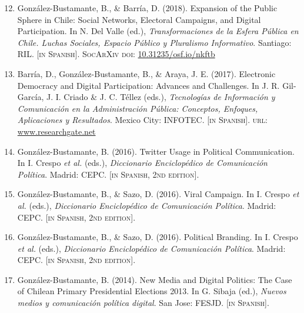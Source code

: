 \documentclass[letterpaper,margin]{res}
\newenvironment{benumerate}[1]{
    \let\oldItem\item
    \def\item{\addtocounter{enumi}{-2}\oldItem}
    \begin{enumerate}
    \setcounter{enumi}{#1}
    \addtocounter{enumi}{1}
}{
    \end{enumerate}
}
\begin{document}
\begin{resume}
\begin{benumerate}{11}
\item{\small Gonz\'alez-Bustamante, B., \& Barr\'ia, D. (2018). Expansion of the Public Sphere in Chile: Social Networks, Electoral Campaigns, and Digital Participation. In N. Del Valle (ed.), {\itshape Transformaciones de la Esfera P\'ublica en Chile. Luchas Sociales, Espacio P\'ublico y Pluralismo Informativo}. Santiago: RIL. {\footnotesize \scshape [in Spanish]}. {\scshape {\footnotesize SocArXiv} doi}: \href{https://doi.org/10.31235/osf.io/nkftb}{10.31235/osf.io/nkftb}}\vspace{1,1mm}

\item{\small Barr\'ia, D., Gonz\'alez-Bustamante, B., \& Araya, J. E. (2017). Electronic Democracy and Digital Participation: Advances and Challenges. In J. R. Gil-Garc\'ia, J. I. Criado \&  J. C. T\'ellez (eds.), {\itshape Tecnolog\'ias de Informaci\'on y Comunicaci\'on en la Administraci\'on P\'ublica: Conceptos, Enfoques, Aplicaciones y Resultados}. Mexico City: INFOTEC. {\footnotesize \scshape [in Spanish]}. {\scshape url}: \href{https://www.researchgate.net/publication/321980289_Democracia_electronica_y_participacion_digital_Avances_y_desafios}{www.researchgate.net}}\vspace{1mm}

\item{\small Gonz\'alez-Bustamante, B. (2016). Twitter Usage in Political Communication. In I. Crespo {\itshape et al.} (eds.), {\itshape Diccionario Enciclop\'edico de Comunicaci\'on Pol\'itica}. Madrid: CEPC. {\footnotesize \scshape [in Spanish, 2nd edition]}.}\vspace{1mm}

\item{\small Gonz\'alez-Bustamante, B., \& Sazo, D. (2016). Viral Campaign. In I. Crespo {\itshape et al.} (eds.), {\itshape Diccionario Enciclop\'edico de Comunicaci\'on Pol\'itica}. Madrid: CEPC. {\footnotesize \scshape [in Spanish, 2nd edition]}.}\vspace{1mm}

\item{\small Gonz\'alez-Bustamante, B., \& Sazo, D. (2016). Political Branding. In I. Crespo {\itshape et al.} (eds.), {\itshape Diccionario Enciclop\'edico de Comunicaci\'on Pol\'itica}. Madrid: CEPC. {\footnotesize \scshape [in Spanish, 2nd edition]}.}\vspace{1mm}

\item{\small Gonz\'alez-Bustamante, B. (2014). New Media and Digital Politics: The Case of Chilean Primary Presidential Elections 2013. In G. Sibaja (ed.), {\itshape Nuevos medios y comunicaci\'on pol\'itica digital}. San Jose: FESJD. {\footnotesize \scshape [in Spanish]}.}\vspace{1mm}


\end{benumerate}
\end{resume}
\end{document}
